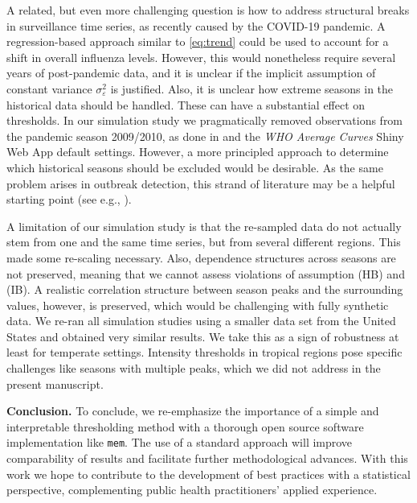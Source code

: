 \documentclass[12pt]{article}
\begin{document}
A related, but even more challenging question is how to address structural breaks in surveillance time series, as recently caused by the COVID-19 pandemic. A regression-based approach similar to \eqref{eq:trend} could be used to account for a shift in overall influenza levels. However, this would nonetheless require several years of post-pandemic data, and it is unclear if the implicit assumption of constant variance $\sigma^2_\varepsilon$ is justified. Also, it is unclear how extreme seasons in the historical data should be handled. These can have a substantial effect on thresholds. In our simulation study we pragmatically removed observations from the pandemic season 2009/2010, as done in \cite{Vega2015} and the \textit{WHO Average Curves} Shiny Web App default settings. However, a more principled approach to determine which historical seasons should be excluded would be desirable. As the same problem arises in outbreak detection, this strand of literature may be a helpful starting point (see e.g., \citealt{Noufaily2013}).



A limitation of our simulation study is that the re-sampled data do not actually stem from one and the same time series, but from several different regions. This made some re-scaling necessary. Also, dependence structures across seasons are not preserved, meaning that we cannot assess violations of assumption (HB) and (IB). A realistic correlation structure between season peaks and the surrounding values, however, is preserved, which would be challenging with fully synthetic data. We re-ran all simulation studies using a smaller data set from the United States and obtained very similar results. We take this as a sign of robustness at least for temperate settings. Intensity thresholds in tropical regions pose specific challenges like seasons with multiple peaks, which we did not address in the present manuscript.




\noindent \textbf{Conclusion.} To conclude, we re-emphasize the importance of a simple and interpretable thresholding method with a thorough open source software implementation like \texttt{mem}. The use of a standard approach will improve comparability of results and facilitate further methodological advances. With this work we hope to contribute to the development of best practices  with a statistical perspective, complementing public health practitioners' applied experience.
\end{document}
